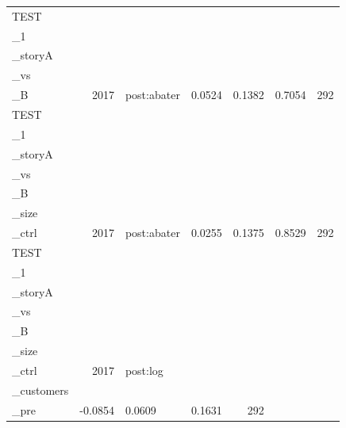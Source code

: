 \begin{table}[ht]
\begin{tabular}{lrlrrrr}
  TEST\\_1\\_storyA\\_vs\\_B &  2017 & post:abater & 0.0524 & 0.1382 & 0.7054 &   292 \\ 
  TEST\\_1\\_storyA\\_vs\\_B\\_size\\_ctrl &  2017 & post:abater & 0.0255 & 0.1375 & 0.8529 &   292 \\ 
  TEST\\_1\\_storyA\\_vs\\_B\\_size\\_ctrl &  2017 & post:log\\_customers\\_pre & -0.0854 & 0.0609 & 0.1631 &   292 \\ 
   \bottomrule
\end{tabular}
\end{table}
